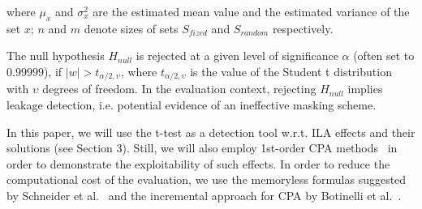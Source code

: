 where $\mu_{x}$ and $\sigma_{x}^2$ are the estimated mean value and the estimated variance of the set $x$;
$n$ and $m$ denote sizes of sets $S_{fized}$ and $S_{random}$ respectively.

The null hypothesis $H_{null}$ is rejected at a given level of significance $\alpha$ (often set to $0.99999$), if $\lvert w \lvert >  t_{\alpha/2,\upsilon}  $, where $t_{\alpha/2,\upsilon}$ is the value of the Student t distribution with $\upsilon$ degrees of freedom. In the evaluation context, rejecting $H_{null}$ implies leakage detection, i.e. potential evidence of an ineffective masking scheme.

In this paper, we will use the t-test as a detection tool w.r.t. ILA effects and their solutions (see Section 3). Still, we will also employ 1st-order CPA methods~\cite{DBLP:conf/ches/BrierCO04} in order to demonstrate the exploitability of such effects. In order to reduce the computational cost of the evaluation, we use the memoryless formulas suggested by Schneider et al.~\cite{DBLP:conf/ches/SchneiderM15} and the incremental approach for CPA by Botinelli et al.~\cite{DBLP:journals/iacr/BottinelliB15}.


